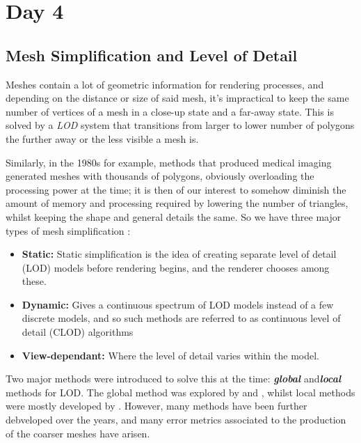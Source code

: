 \chapter{Day 4}

\section{Mesh Simplification and Level of Detail}

Meshes contain a lot of geometric information for rendering processes,
and depending on the distance or size of said mesh, it's impractical to keep
the same number of vertices of a mesh in a close-up state and a far-away state.
This is solved by a \emph{LOD} system that transitions from larger to lower
number of polygons the further away or the less visible a mesh is.

\spa

Similarly, in the 1980s for example, methods that produced medical imaging
generated meshes with thousands of polygons, obviously overloading the
processing power at the time; it is then of our interest to somehow diminish
the amount of memory and processing required by lowering the number of triangles,
whilst keeping the shape and general details the same. So we have three major
types of mesh simplification \cite{realtime}:

\begin{itemize}
    \item \textbf{Static:} Static simplification is the idea of 
    creating separate level of detail (LOD) models before rendering begins, 
    and the renderer chooses among these.
    
    \item \textbf{Dynamic:} Gives a continuous spectrum of
    LOD models instead of a few discrete models, and so such methods 
    are referred to as continuous level of detail (CLOD) algorithms
    
    \item \textbf{View-dependant:} Where the level of
    detail varies within the model.
\end{itemize}

\spa

Two major methods were introduced to solve this at the time:
\textbf{\emph{global}} and\textbf{\emph{local}} methods for
LOD. The global method was explored by \cite{Hoppe1} and \cite{turk1}, 
whilst local methods were mostly developed by \cite{schroeder1}. 
However, many methods have been further debveloped over the years, and
many error metrics associated to the production of the coarser meshes
have arisen.


